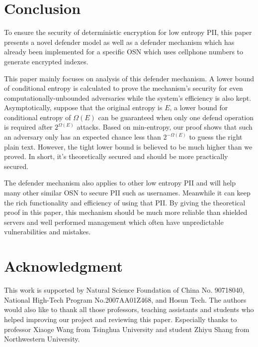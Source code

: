 \documentclass[10pt, conference, compsocconf]{IEEEtran}
\begin{document}
\section{Conclusion}\label{sec_cl}
    To ensure the security of deterministic encryption
    for low entropy PII,
    this paper presents a novel defender model as well
    as a defender mechanism which has already been implemented
	for a specific
    OSN which uses cellphone numbers to generate encrypted indexes.

    This paper mainly focuses on analysis of this defender mechanism.
    A lower bound of conditional entropy is calculated to
    prove the mechanism's security for even
    computationally-unbounded adversaries while
    the system's efficiency is also kept.
    Asymptotically, suppose that the original entropy is $E$,
    a lower bound for conditional entropy of $\Omega(E)$ can be
    guaranteed when only one defend operation is required after
    $2^{\Omega(E)}$ attacks.
    Based on min-entropy, our proof shows that
    such an adversary only has an expected chance
    less than $2^{-\Omega(E)}$ to guess the right plain text.
    However, the tight lower bound 
    is believed to be much higher than we proved.
    In short, it's theoretically secured and should be more practically secured.
    
	The defender mechanism also applies to other low entropy
	PII and will help many other similar OSN to secure PII such
	as usernames. Meanwhile it can keep the rich functionality and efficiency
	of using that PII. By giving the theoretical proof
	in this paper, this mechanism should be much more reliable than
	shielded servers and well performed management which often have unpredictable
	vulnerabilities and mistakes.



\section*{Acknowledgment}
This work is supported by Natural Science Foundation of China No. 90718040, National High-Tech Program No.2007AA01Z468, 
and Hosun Tech.
The authors would also like to thank all those professors, teaching assistants and students
who helped improving our project and reviewing this paper. Especially thanks to professor
Xiaoge Wang from Tsinghua University and student Zhiyu Shang from Northwestern University.
\end{document}
